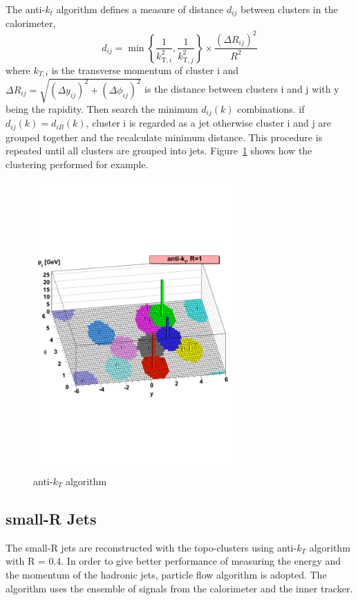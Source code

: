 The anti-$k_t$ algorithm defines a measure of distance $d_{ij}$ between clusters in the calorimeter,
\begin{equation}
d_{i j}=\min \left\{\frac{1}{k_{\mathrm{T}, i}^{2}}, \frac{1}{k_{\mathrm{T}, j}^{2}}\right\} \times \frac{\left(\Delta R_{i j}\right)^{2}}{R^{2}}
\end{equation}
where $k_{T,i}$ is the transverse momentum of cluster i and $\Delta R_{i j}=\sqrt{\left(\Delta y_{i j}\right)^{2}+\left(\Delta \phi_{i j}\right)^{2}}$ is the distance between clusters i and j with y being the rapidity. Then search the minimum $d_{i j}(k)$ combinations. if $d_{i j}(k) = d_{i B}(k)$, cluster i is regarded as a jet otherwise cluster i and j are grouped together and the recalculate minimum distance. This procedure is repeated until all clusters are grouped into jets.
Figure~\ref{fig:antikt} shows how the clustering performed for example.
\begin{figure}[tbp]
\begin{center}
 \includegraphics[width=0.70\textwidth,keepaspectratio]{figures/Reconstruction/antikt}
\caption{
anti-$k_T$ algorithm \cite{Cacciari_2008}
}
\label{fig:antikt}
\end{center}
\end{figure}

\subsection{small-R Jets}
The small-R jets are reconstructed with the topo-clusters using anti-$k_T$ algorithm with R = 0.4. In order to give better performance of measuring the energy and the momentum of the hadronic jets, particle flow algorithm \cite{PERF-2015-09} is adopted. The algorithm uses the ensemble of signals from the calorimeter and the inner tracker. 

